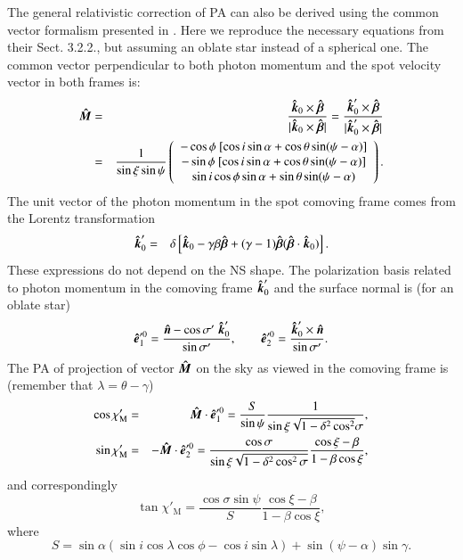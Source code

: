 \documentclass{aa}
\newcommand{\be}{\begin{equation}}
\newcommand{\ee}{\end{equation}}
\newcommand{\beq}{\begin{eqnarray}}
\newcommand{\eeq}{\end{eqnarray}}
\newcommand{\unit}[1]{\mbox{\boldmath $\hat{#1}$}}
\begin{document}
The general relativistic correction of PA can also be derived using the common vector formalism presented in \citet{poutanen20}. 
Here we reproduce the necessary equations from their Sect. 3.2.2., but assuming an oblate star instead of a spherical one.
The common vector perpendicular to both photon momentum and the spot velocity vector in both frames is:  
\beq \label{eq:comm_vector_rel}
\unit{M} & =&  \frac{\unit{k}_0 \times \unit{\beta}  }{|\unit{k}_0 \times \unit{\beta} |}  
= \frac{\unit{k}^{\prime}_0 \times \unit{\beta}  }{|\unit{k}^{\prime}_0\times \unit{\beta} |}  \\
& =&\frac{1}{\sin\xi \sin\psi} \left( \begin{array}{c} 
-\cos \phi\ [\cos i \sin \alpha + \cos\theta \sin(\psi-\alpha)] \\
-\sin \phi\ [\cos i \sin \alpha + \cos\theta \sin(\psi-\alpha)] \\
 \sin i \cos \phi  \sin \alpha + \sin\theta \sin(\psi-\alpha)  
\end{array}  \right) .    \nonumber
\eeq
The unit vector of the photon momentum in the spot comoving frame comes from the Lorentz transformation 
\beq 
\unit{k}^{\prime}_0&=& \delta \left[ \unit{k}_0 - \gamma\beta \unit{\beta} + (\gamma-1) \unit{\beta} (\unit{\beta}\cdot \unit{k}_0 ) \right] .
\eeq 
These expressions do not depend on the NS shape.
The polarization basis related to photon momentum in the comoving frame $\unit{k}_0'$ and the surface normal is (for an oblate star) 
\be\label{eq:pout47}
\unit{e}_1'^{0} = \frac{\unit{n}-\cos{\sigma'}\  \unit{k}_0'}{\sin{\sigma'}},\qquad 
\unit{e}_2'^{0} = \frac{\unit{k}_0' \times \unit{n}}{\sin{\sigma'}} .
\ee
The PA of projection of vector $\unit{M}$ on the sky as viewed in the comoving frame is (remember that $\lambda = \theta-\gamma$)
\beq\label{eq:pout48}
\cos{\chi'_{\mathrm{M}}}&=&\unit{M} \cdot \unit{e}_1'^{0} = 
\frac{S}{\sin \psi} 
\frac{1}{\sin\xi\sqrt{1-\delta^{2}\cos^{2}}\sigma} , \\
\label{eq:pout49}
\sin{\chi'_{\mathrm{M}}}&= & - \unit{M} \cdot \unit{e}_2'^{0} %
= \frac{\cos \sigma}{\sin \xi \sqrt{1-\delta^{2}\cos^{2}\sigma}}\frac{\cos \xi - \beta}{1 - \beta \cos \xi},
\eeq
and correspondingly
\be\label{eq:pout50}
\tan{\chi'_{\mathrm{M}}} = \frac{\cos \sigma \sin \psi}{S} \frac{\cos \xi - \beta}{1 - \beta \cos \xi},
\ee
where
\be
S=\sin \alpha (\sin i \cos \lambda \cos \phi - \cos i \sin \lambda)  + \sin (\psi-\alpha) \sin \gamma .
\ee
\end{document}

